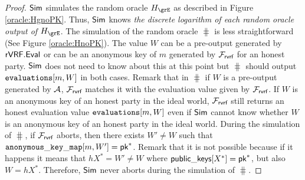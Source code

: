 \begin{proof}
		$ \mathsf{Sim} $ simulates the random oracle $ \hashG $ as described in Figure \ref{oracle:HgnoPK}.  Thus, $ \mathsf{Sim} $ knows \emph{the discrete logarithm of each random oracle output of $\hashG  $}. 
		 The simulation of the random oracle $ \hash $ is less straightforward (See Figure \ref{oracle:HnoPK}).
		The value $ W $ can be a pre-output generated by $ {\mathsf{rVRF}}.{\mathsf{Eval}} $ or can be an anonymous key of  $ m $ generated by $ \mathcal{F}_{\textsf{rvrf}} $ for an honest party. $ \mathsf{Sim} $ does not need to know about this at this point but $ \hash $ should output $ \texttt{evaluations}[m,W] $ in both cases.	 
		Remark that in $ \hash $ if $ W $ is a pre-output generated by $ \mathcal{A} $,  $ \mathcal{F}_{\textsf{rvrf}} $ matches it with the evaluation value given by $ \mathcal{F}_{\textsf{rvrf}} $. If $ W $ is an anonymous key of an honest party in the ideal world, $ \mathcal{F}_{\textsf{rvrf}} $ still returns an honest evaluation value $ \texttt{evaluations}[m,W] $ even if $ \mathsf{Sim} $ cannot know whether $ W $ is an anonymous key of an honest party in the ideal world. 
		During the simulation of $ \hash $, if $ \mathcal{F}_{\textsf{rvrf}} $ aborts, then there exists $ W' \neq W $ such that $ \mathtt{anonymous\_key\_map}[m,W'] = \mathsf{pk}^* $. Remark that it is not possible because if it happens it means that $ hX^* = W' \neq W  $ where $ {\mathsf{public\_keys}}[X^*] = \mathsf{pk}^* $, but also $ W = hX^* $. 
		Therefore, $ \mathsf{Sim} $ never aborts during the simulation of $ \hash $.
		

\end{proof}
